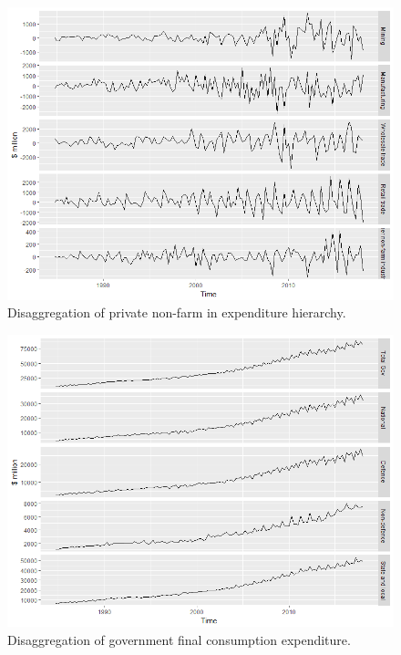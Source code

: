\documentclass[graybox]{svmult}
\begin{document}
\begin{figure}[H]
	\centering
	\small
	\includegraphics[scale=0.5]{Figs/TS-plots/EXP-hierarchy/set-4.png}
	\caption{Disaggregation of private non-farm in expenditure hierarchy.}\label{EXP-set-4}
\end{figure}

\begin{figure}[H]
	\centering
	\small
	\includegraphics[scale=0.5]{Figs/TS-plots/EXP-hierarchy/set-5.png}
	\caption{Disaggregation of government final consumption expenditure.}\label{EXP-set-5}
\end{figure}
\end{document}
